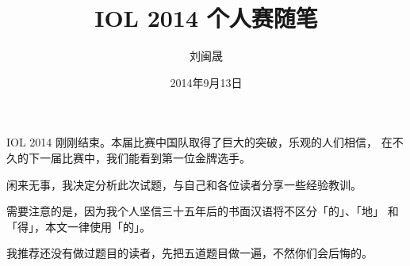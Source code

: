 \documentclass[11pt]{article}
\title{IOL 2014 个人赛随笔}
\date{2014年9月13日}
\author{刘闽晟}
\newcommand \sq [1]{「#1」}
\begin{document}


\maketitle

IOL 2014 刚刚结束。本届比赛中国队取得了巨大的突破，乐观的人们相信，
在不久的下一届比赛中，我们能看到第一位金牌选手。

闲来无事，我决定分析此次试题，与自己和各位读者分享一些经验教训。

需要注意的是，因为我个人坚信三十五年后的书面汉语将不区分\sq{的}、\sq{地}
和\sq{得}，本文一律使用\sq{的}。

我推荐还没有做过题目的读者，先把五道题目做一遍，不然你们会后悔的。








\renewcommand \refname{引用}

\end{document}
